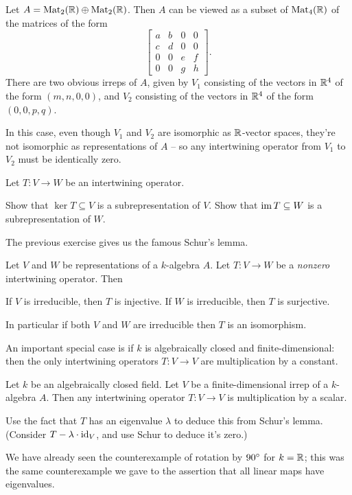 \begin{example}
	Let $A = \mathrm{Mat}_2(\mathbb R)\oplus\mathrm{Mat}_2(\mathbb R)$. Then $A$ can be viewed as a subset
	of $\mathrm{Mat}_4(\mathbb R)$ of the matrices of the form
	\[
		\begin{bmatrix}
			a&b&0&0 \\
			c&d&0&0 \\
			0&0&e&f \\
			0&0&g&h
		\end{bmatrix}.
	\]
	There are two obvious irreps of $A$, given by $V_1$ consisting of the vectors
	in $\mathbb R^4$ of the form $(m, n, 0, 0)$, and $V_2$ consisting of the vectors in
	$\mathbb R^4$ of the form $(0, 0, p, q)$.

	In this case, even though $V_1$ and $V_2$ are isomorphic as $\mathbb R$-vector
	spaces, they're not isomorphic as representations of $A$ -- so any
	intertwining operator from $V_1$ to $V_2$ must be identically zero.
\end{example}

\begin{exercise}
	Let $T \colon V \to W$ be an intertwining operator.
	\begin{enumerate}[(a)]
		\ii Show that $\ker T \subseteq V$ is a subrepresentation of $V$.
		\ii Show that $\operatorname{im} T \subseteq W$ is a subrepresentation of $W$.
	\end{enumerate}
\end{exercise}

The previous exercise gives us the famous Schur's lemma.
\begin{theorem}
	Let $V$ and $W$ be representations of a $k$-algebra $A$.
	Let $T \colon V \to W$ be a \emph{nonzero} intertwining operator.
	Then
	\begin{enumerate}[(a)]
		\ii If $V$ is irreducible, then $T$ is injective.
		\ii If $W$ is irreducible, then $T$ is surjective.
	\end{enumerate}
	In particular if both $V$ and $W$ are irreducible then $T$
	is an isomorphism.
\end{theorem}
An important special case is if $k$ is algebraically closed and finite-dimensional:
then the only intertwining operators $T \colon V \to V$
are multiplication by a constant.
\begin{theorem}
	Let $k$ be an algebraically closed field.
	Let $V$ be a finite-dimensional irrep of a $k$-algebra $A$.
	Then any intertwining operator $T \colon V \to V$ is multiplication by a scalar.
	\label{thm:schur_algclosed}
\end{theorem}
\begin{exercise}
	Use the fact that $T$ has an eigenvalue $\lambda$ to
	deduce this from Schur's lemma.
	(Consider $T - \lambda \cdot \mathrm{id}_V$, and use Schur to deduce it's zero.)
\end{exercise}
We have already seen the counterexample of rotation by $90^\circ$ for $k = \mathbb R$;
this was the same counterexample we gave to the assertion that all linear maps
have eigenvalues.

